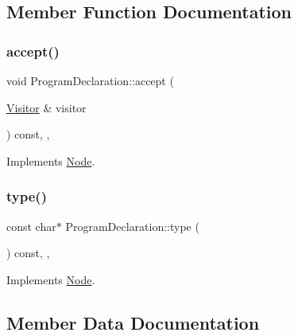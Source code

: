 \subsection{Member Function Documentation}
\mbox{\label{struct_program_declaration_a6c3153c56bfa1c3a42c33efce6aa2e1d}} 
\subsubsection{\texorpdfstring{accept()}{accept()}}
{\footnotesize\ttfamily void Program\+Declaration\+::accept (\begin{DoxyParamCaption}\item[{\hyperlink{struct_visitor}{Visitor} \&}]{visitor }\end{DoxyParamCaption}) const\hspace{0.3cm}{\ttfamily [inline]}, {\ttfamily [override]}, {\ttfamily [virtual]}}



Implements \hyperlink{struct_node_a10bd7af968140bbf5fa461298a969c71}{Node}.

\mbox{\label{struct_program_declaration_a82ac243f6062ca5165de5963053ddd3f}} 
\subsubsection{\texorpdfstring{type()}{type()}}
{\footnotesize\ttfamily const char$\ast$ Program\+Declaration\+::type (\begin{DoxyParamCaption}{ }\end{DoxyParamCaption}) const\hspace{0.3cm}{\ttfamily [inline]}, {\ttfamily [override]}, {\ttfamily [virtual]}}



Implements \hyperlink{struct_node_a82f29420d0a38efcc370352528e94e9b}{Node}.



\subsection{Member Data Documentation}
\mbox{\label{struct_program_declaration_ae1f2311bd59d1441031c04da233649d6}} 
